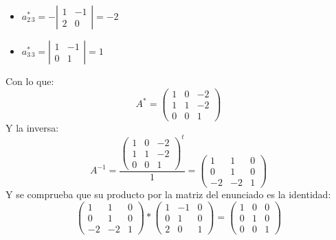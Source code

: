 \documentclass[a4paper,11pt,answers]{exam}
\newcommand\adjunto[1]{#1^\text{*}}
\begin{document}
\begin{questions}
\begin{solution}
\begin{small}
\begin{multicols}{3}
\begin{itemize}
		\item $\adjunto{a_{2\,3}} = -\left|\begin{array}{rr}
			1&-1\\
			2&0
		\end{array}\right| = -2$
		\item $\adjunto{a_{3\,3}} = \left|\begin{array}{rr}
			1&-1\\
			0&1
		\end{array}\right| = 1$
	\end{itemize}
\end{multicols}
Con lo que:
\[\adjunto{A} = \left(\begin{array}{rrr}
	1&0&-2\\
	1&1&-2\\
	0&0&1
\end{array}\right)\]
Y la inversa:
\[A^{-1} = \frac{\left(\begin{array}{rrr}
		1&0&-2\\
		1&1&-2\\
		0&0&1
	\end{array}\right)^t}{1} = \left(\begin{array}{rrr}
1&1&0\\
0&1&0\\
-2&-2&1
\end{array}\right)\]
Y se comprueba que su producto por la matriz del enunciado es la identidad:
\[\left(\begin{array}{rrr}
	1&1&0\\
	0&1&0\\
	-2&-2&1
\end{array}\right) * \left(\begin{array}{rrr}
1&-1&0\\
0&1&0\\
2&0&1
\end{array}\right) = \left(\begin{array}{rrr}
1&0&0\\
0&1&0\\
0&0&1
\end{array}\right)\]
\end{small}
\end{solution}
\end{questions}
\end{document}
